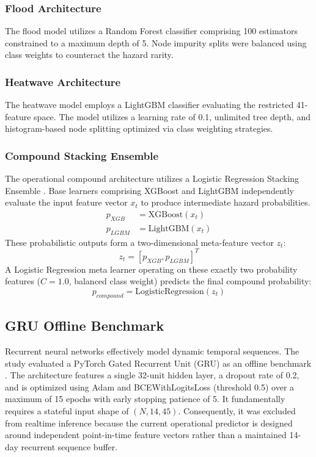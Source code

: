 \subsubsection{Flood Architecture}
The flood model utilizes a Random Forest classifier \cite{Breiman2001} comprising 100 estimators constrained to a maximum depth of 5. Node impurity splits were balanced using class weights to counteract the hazard rarity. 

\subsubsection{Heatwave Architecture}
The heatwave model employs a LightGBM \cite{Ke2017} classifier evaluating the restricted 41-feature space. The model utilizes a learning rate of 0.1, unlimited tree depth, and histogram-based node splitting optimized via class weighting strategies.

\subsubsection{Compound Stacking Ensemble}
The operational compound architecture utilizes a Logistic Regression Stacking Ensemble \cite{Wolpert1992}. Base learners comprising XGBoost \cite{Chen2016} and LightGBM independently evaluate the input feature vector $x_t$ to produce intermediate hazard probabilities.
\begin{equation}
\begin{aligned}
p_{XGB} &= \text{XGBoost}(x_t) \\
p_{LGBM} &= \text{LightGBM}(x_t)
\end{aligned}
\end{equation}
These probabilistic outputs form a two-dimensional meta-feature vector $z_t$:
\begin{equation}
z_t = [p_{XGB}, p_{LGBM}]^T
\end{equation}
A Logistic Regression meta learner operating on these exactly two probability features ($C=1.0$, balanced class weight) predicts the final compound probability:
\begin{equation}
p_{compound} = \text{LogisticRegression}(z_t)
\end{equation}

\subsection{GRU Offline Benchmark}
Recurrent neural networks effectively model dynamic temporal sequences. The study evaluated a PyTorch Gated Recurrent Unit (GRU) \cite{Cho2014} as an offline benchmark \cite{Kratzert2018}. The architecture features a single 32-unit hidden layer, a dropout rate of 0.2, and is optimized using Adam and BCEWithLogitsLoss (threshold 0.5) over a maximum of 15 epochs with early stopping patience of 5. It fundamentally requires a stateful input shape of $(N, 14, 45)$. Consequently, it was excluded from realtime inference because the current operational predictor is designed around independent point-in-time feature vectors rather than a maintained 14-day recurrent sequence buffer.

